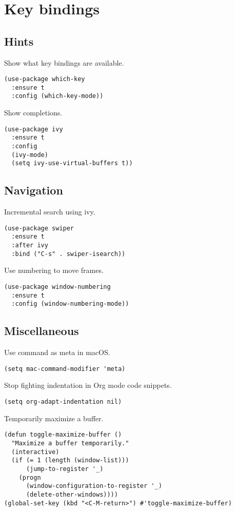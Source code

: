 \documentclass[a4paper,11pt]{article}
\begin{document}
\section{Key bindings}
\label{sec:orgba78cc6}
\subsection{Hints}
\label{sec:orgd00951a}
Show what key bindings are available.
\begin{verbatim}
(use-package which-key
  :ensure t
  :config (which-key-mode))
\end{verbatim}

Show completions.
\begin{verbatim}
(use-package ivy
  :ensure t
  :config
  (ivy-mode)
  (setq ivy-use-virtual-buffers t))
\end{verbatim}

\subsection{Navigation}
\label{sec:org506e1ee}
Incremental search using ivy.
\begin{verbatim}
(use-package swiper
  :ensure t
  :after ivy
  :bind ("C-s" . swiper-isearch))
\end{verbatim}

Use numbering to move frames.
\begin{verbatim}
(use-package window-numbering
  :ensure t
  :config (window-numbering-mode))
\end{verbatim}

\subsection{Miscellaneous}
\label{sec:org09dfba2}
Use command as meta in macOS.
\begin{verbatim}
(setq mac-command-modifier 'meta)
\end{verbatim}

Stop fighting indentation in Org mode code snippets.
\begin{verbatim}
(setq org-adapt-indentation nil)
\end{verbatim}

Temporarily maximize a buffer.
\begin{verbatim}
(defun toggle-maximize-buffer ()
  "Maximize a buffer temporarily."
  (interactive)
  (if (= 1 (length (window-list)))
      (jump-to-register '_)
    (progn
      (window-configuration-to-register '_)
      (delete-other-windows))))
(global-set-key (kbd "<C-M-return>") #'toggle-maximize-buffer)
\end{verbatim}
\end{document}
